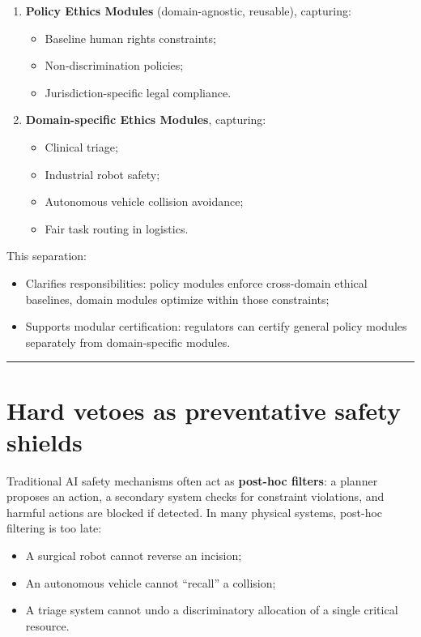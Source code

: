 \documentclass[11pt]{article}
\begin{document}
\begin{enumerate}
  \item \textbf{Policy Ethics Modules} (domain-agnostic, reusable), capturing:
  \begin{itemize}[label=$\circ$]
    \item Baseline human rights constraints;
    \item Non-discrimination policies;
    \item Jurisdiction-specific legal compliance.
  \end{itemize}

  \item \textbf{Domain-specific Ethics Modules}, capturing:
  \begin{itemize}[label=$\circ$]
    \item Clinical triage;
    \item Industrial robot safety;
    \item Autonomous vehicle collision avoidance;
    \item Fair task routing in logistics.
  \end{itemize}
\end{enumerate}

This separation:

\begin{itemize}
  \item Clarifies responsibilities: policy modules enforce cross-domain ethical baselines, domain modules optimize within those constraints;
  \item Supports modular certification: regulators can certify general policy modules separately from domain-specific modules.
\end{itemize}

\hrule
\vspace{1em}

\section{Hard vetoes as preventative safety shields}

Traditional AI safety mechanisms often act as \textbf{post-hoc filters}: a planner proposes an action, a secondary system checks for constraint violations, and harmful actions are blocked if detected. In many physical systems, post-hoc filtering is too late:

\begin{itemize}
  \item A surgical robot cannot reverse an incision;
  \item An autonomous vehicle cannot ``recall'' a collision;
  \item A triage system cannot undo a discriminatory allocation of a single critical resource.
\end{itemize}
\end{document}
